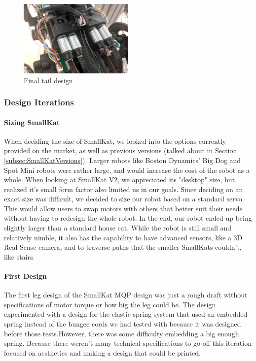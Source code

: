         \begin{figure}[H]
                \centering
                \includegraphics[width=0.5\textwidth]{figures/FinalTailDesign.jpg}
                \caption{Final tail design}
                \label{fig:Finaltaildesgin}
        \end{figure}   
            
        \subsubsection{Design Iterations} 
        
       \paragraph{Sizing SmallKat}
         When deciding the size of SmallKat, we looked into the options currently provided on the market, as well as previous versions (talked about in Section \ref{subsec:SmallKatVersions}). Larger robots like Boston Dynamics' Big Dog and Spot Mini robots were rather large, and would increase the cost of the robot as a whole. When looking at SmallKat V2, we appreciated its "desktop" size, but realized it's small form factor also limited us in our goals. Since deciding on an exact size was difficult, we decided to size our robot based on a standard servo. This would allow users to swap motors with others that better suit their needs without having to redesign the whole robot. In the end, our robot ended up being slightly larger than a standard house cat. While the robot is still small and relatively nimble, it also has the capability to have advanced sensors, like a 3D Real Sense camera, and to traverse paths that the smaller SmallKats couldn't, like stairs. 
        
        \paragraph{First Design}
        The first leg design of the SmallKat MQP design was just a rough draft without specifications of motor torque or how big the leg could be. The design experimented with a design for the elastic spring system that used an embedded spring instead of the bungee cords we had tested with because it was designed before those tests.However, there was some difficulty embedding a big enough spring. Because there weren't many technical specifications to go off this iteration focused on aesthetics and making a design that could be printed. 
        
